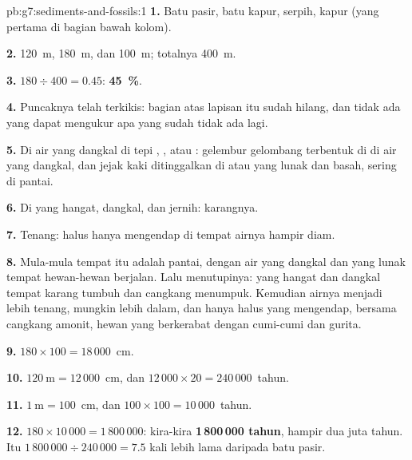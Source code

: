 \begin{solution}{pb:g7:sediments-and-fossils:1}
\textbf{1.} Batu pasir, batu kapur, serpih, kapur (yang pertama di bagian
bawah kolom).

\textbf{2.} \qty{120}{m}, \qty{180}{m}, dan \qty{100}{m}; totalnya
\qty{400}{m}.

\textbf{3.} $180 \div 400 = 0.45$: \textbf{45~\%}.

\textbf{4.} Puncaknya telah terkikis: bagian atas lapisan itu sudah hilang,
dan tidak ada yang dapat mengukur apa yang sudah tidak ada lagi.

\textbf{5.} Di air yang dangkal di tepi , , atau : gelembur
gelombang terbentuk di  di air yang dangkal, dan jejak kaki
ditinggalkan di  atau  yang lunak dan basah, sering di pantai.

\textbf{6.} Di  yang hangat, dangkal, dan jernih: karangnya.

\textbf{7.} Tenang:  halus hanya mengendap di tempat airnya hampir diam.

\textbf{8.} Mula-mula tempat itu adalah pantai, dengan air yang dangkal dan
 yang lunak tempat hewan-hewan berjalan. Lalu  menutupinya: 
yang hangat dan dangkal tempat karang tumbuh dan cangkang menumpuk.
Kemudian airnya menjadi lebih tenang, mungkin lebih dalam, dan hanya 
halus yang mengendap, bersama cangkang amonit, hewan yang berkerabat dengan
cumi-cumi dan gurita.

\textbf{9.} $180 \times 100 = 18\,000$~cm.

\textbf{10.} $120~\text{m} = 12\,000$~cm, dan $12\,000 \times 20 =
240\,000$~tahun.

\textbf{11.} $1~\text{m} = 100$~cm, dan $100 \times 100 = 10\,000$~tahun.

\textbf{12.} $180 \times 10\,000 = 1\,800\,000$: kira-kira
\textbf{1\,800\,000 tahun}, hampir dua juta tahun. Itu
$1\,800\,000 \div 240\,000 = 7.5$ kali lebih lama daripada batu pasir.
\end{solution}
